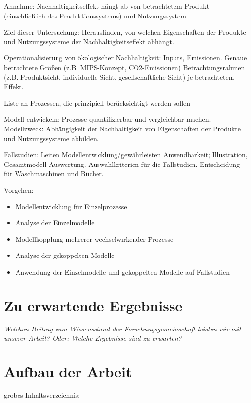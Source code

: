 \documentclass[11pt, titlepage=true]{scrartcl} %
\newcommand{\was}[1]{\small\textit{#1}}
\begin{document}
Annahme: Nachhaltigkeitseffekt hängt ab von betrachtetem Produkt (einschließlich des Produktionssystems) und Nutzungssystem.

Ziel dieser Untersuchung: Herausfinden, von welchen Eigenschaften der Produkte und Nutzungssysteme der Nachhaltigkeitseffekt abhängt.

Operationalisierung von ökologischer Nachhaltigkeit: Inputs, Emissionen. Genaue betrachtete Größen (z.B. MIPS-Konzept, CO2-Emissionen) Betrachtungsrahmen (z.B. Produktsicht, individuelle Sicht, gesellschaftliche Sicht) je betrachtetem Effekt.

Liste an Prozessen, die prinzipiell berücksichtigt werden sollen

Modell entwickeln: Prozesse quantifizierbar und vergleichbar machen.  Modellzweck: Abhängigkeit der Nachhaltigkeit von Eigenschaften der Produkte und Nutzungssysteme abbilden.

Fallstudien: Leiten Modellentwicklung/gewährleisten Anwendbarkeit; Illustration, Gesamtmodell-Auswertung.
Auswahlkriterien für die Fallstudien. Entscheidung für Waschmaschinen und Bücher.

Vorgehen:
\begin{itemize}
	\item Modellentwicklung für Einzelprozesse
	\item Analyse der Einzelmodelle
	\item Modellkopplung mehrerer wechselwirkender Prozesse
	\item Analyse der gekoppelten Modelle
	\item Anwendung der Einzelmodelle und gekoppelten Modelle auf Fallstudien
\end{itemize}


\section{Zu erwartende Ergebnisse}
\was{Welchen Beitrag zum Wissensstand der Forschungsgemeinschaft leisten wir mit
unserer Arbeit?
Oder: Welche Ergebnisse sind zu erwarten?}

\newpage
\section{Aufbau der Arbeit}
grobes Inhaltsverzeichnis:
\end{document}
